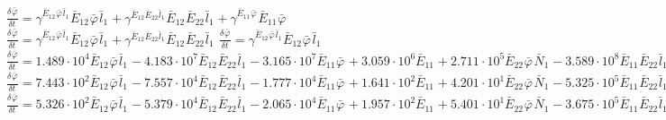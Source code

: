 $\frac{{\delta}^{} {\bar{\varphi}}_{}}{{\delta} {{{t}}_{}}^{}} = {\gamma}^{{{{\bar{E}}_{12}}^{}{{\bar{\varphi}}_{}}^{}{{\bar{l}}_{1}}^{}}}{{{\bar{E}}_{12}}^{}{{\bar{\varphi}}_{}}^{}{{\bar{l}}_{1}}^{}} + {\gamma}^{{{{\bar{E}}_{12}}^{}{{\bar{E}}_{22}}^{}{{\bar{l}}_{1}}^{}}}{{{\bar{E}}_{12}}^{}{{\bar{E}}_{22}}^{}{{\bar{l}}_{1}}^{}} + {\gamma}^{{{{\bar{E}}_{11}}^{}{{\bar{\varphi}}_{}}^{}}}{{{\bar{E}}_{11}}^{}{{\bar{\varphi}}_{}}^{}}$
$\frac{{\delta}^{} {\bar{\varphi}}_{}}{{\delta} {{{t}}_{}}^{}} = {\gamma}^{{{{\bar{E}}_{12}}^{}{{\bar{\varphi}}_{}}^{}{{\bar{l}}_{1}}^{}}}{{{\bar{E}}_{12}}^{}{{\bar{\varphi}}_{}}^{}{{\bar{l}}_{1}}^{}} + {\gamma}^{{{{\bar{E}}_{12}}^{}{{\bar{E}}_{22}}^{}{{\bar{l}}_{1}}^{}}}{{{\bar{E}}_{12}}^{}{{\bar{E}}_{22}}^{}{{\bar{l}}_{1}}^{}}$
$\frac{{\delta}^{} {\bar{\varphi}}_{}}{{\delta} {{{t}}_{}}^{}} = {\gamma}^{{{{\bar{E}}_{12}}^{}{{\bar{\varphi}}_{}}^{}{{\bar{l}}_{1}}^{}}}{{{\bar{E}}_{12}}^{}{{\bar{\varphi}}_{}}^{}{{\bar{l}}_{1}}^{}}$
$\frac{{\delta}^{} {\bar{\varphi}}_{}}{{\delta} {{{t}}_{}}^{}} = 1.489\cdot 10^{4}{{{\bar{E}}_{12}}^{}{{\bar{\varphi}}_{}}^{}{{\bar{l}}_{1}}^{}} - 4.183\cdot 10^{7}{{{\bar{E}}_{12}}^{}{{\bar{E}}_{22}}^{}{{\bar{l}}_{1}}^{}} - 3.165\cdot 10^{7}{{{\bar{E}}_{11}}^{}{{\bar{\varphi}}_{}}^{}} + 3.059\cdot 10^{6}{{{\bar{E}}_{11}}^{}} + 2.711\cdot 10^{5}{{{\bar{E}}_{22}}^{}{{\bar{\varphi}}_{}}^{}{{\bar{N}}_{1}}^{}} - 3.589\cdot 10^{8}{{{\bar{E}}_{11}}^{}{{\bar{E}}_{22}}^{}{{\bar{l}}_{1}}^{}} + 5.855\cdot 10^{6}{{{\bar{E}}_{22}}^{2}{{\bar{l}}_{1}}^{}} + 5.223\cdot 10^{6}{{{\bar{E}}_{11}}^{}{{\bar{\varphi}}_{}}^{}{{\bar{l}}_{1}}^{}} + 3.912\cdot 10^{5}{{{\bar{E}}_{11}}^{}{{\bar{\varphi}}_{}}^{}{{\bar{l}}_{2}}^{}} - 5.454\cdot 10^{7}{{{\bar{E}}_{22}}^{}{{\bar{\varphi}}_{}}^{}{{\bar{l}}_{2}}^{}}$
$\frac{{\delta}^{} {\bar{\varphi}}_{}}{{\delta} {{{t}}_{}}^{}} = 7.443\cdot 10^{2}{{{\bar{E}}_{12}}^{}{{\bar{\varphi}}_{}}^{}{{\bar{l}}_{1}}^{}} - 7.557\cdot 10^{4}{{{\bar{E}}_{12}}^{}{{\bar{E}}_{22}}^{}{{\bar{l}}_{1}}^{}} - 1.777\cdot 10^{4}{{{\bar{E}}_{11}}^{}{{\bar{\varphi}}_{}}^{}} + 1.641\cdot 10^{2}{{{\bar{E}}_{11}}^{}} + 4.201\cdot 10^{1}{{{\bar{E}}_{22}}^{}{{\bar{\varphi}}_{}}^{}{{\bar{N}}_{1}}^{}} - 5.325\cdot 10^{5}{{{\bar{E}}_{11}}^{}{{\bar{E}}_{22}}^{}{{\bar{l}}_{1}}^{}} + 5.135\cdot 10^{3}{{{\bar{E}}_{22}}^{2}{{\bar{l}}_{1}}^{}} + 1.740\cdot 10^{2}{{{\bar{E}}_{11}}^{}{{\bar{\varphi}}_{}}^{}{{\bar{l}}_{1}}^{}} + 4.727{{{\bar{E}}_{11}}^{}{{\bar{\varphi}}_{}}^{}{{\bar{l}}_{2}}^{}}$
$\frac{{\delta}^{} {\bar{\varphi}}_{}}{{\delta} {{{t}}_{}}^{}} = 5.326\cdot 10^{2}{{{\bar{E}}_{12}}^{}{{\bar{\varphi}}_{}}^{}{{\bar{l}}_{1}}^{}} - 5.379\cdot 10^{4}{{{\bar{E}}_{12}}^{}{{\bar{E}}_{22}}^{}{{\bar{l}}_{1}}^{}} - 2.065\cdot 10^{4}{{{\bar{E}}_{11}}^{}{{\bar{\varphi}}_{}}^{}} + 1.957\cdot 10^{2}{{{\bar{E}}_{11}}^{}} + 5.401\cdot 10^{1}{{{\bar{E}}_{22}}^{}{{\bar{\varphi}}_{}}^{}{{\bar{N}}_{1}}^{}} - 3.675\cdot 10^{5}{{{\bar{E}}_{11}}^{}{{\bar{E}}_{22}}^{}{{\bar{l}}_{1}}^{}} + 3.552\cdot 10^{3}{{{\bar{E}}_{22}}^{2}{{\bar{l}}_{1}}^{}} + 1.104\cdot 10^{2}{{{\bar{E}}_{11}}^{}{{\bar{\varphi}}_{}}^{}{{\bar{l}}_{1}}^{}}$
